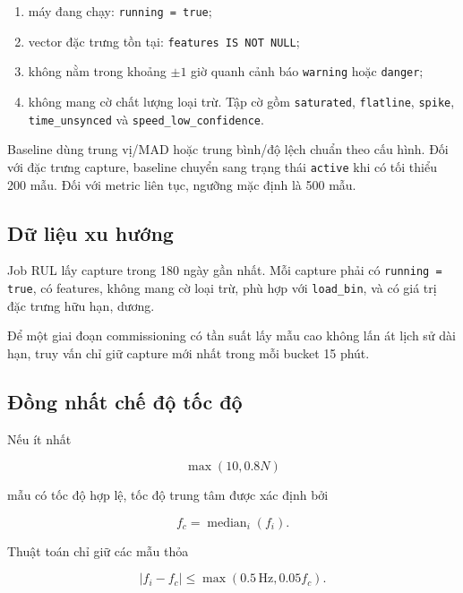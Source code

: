 \documentclass[12pt,a4paper]{article}
\newcommand{\code}[1]{\texttt{#1}}
\begin{document}
\begin{enumerate}
  \item máy đang chạy: \code{running = true};
  \item vector đặc trưng tồn tại: \code{features IS NOT NULL};
  \item không nằm trong khoảng $\pm 1$ giờ quanh cảnh báo \code{warning} hoặc \code{danger};
  \item không mang cờ chất lượng loại trừ. Tập cờ gồm \code{saturated},
  \code{flatline}, \code{spike}, \code{time\_unsynced} và
  \code{speed\_low\_confidence}.
\end{enumerate}

Baseline dùng trung vị/MAD hoặc trung bình/độ lệch chuẩn theo cấu hình. Đối với đặc trưng capture, baseline chuyển sang trạng thái \code{active} khi có tối thiểu 200 mẫu. Đối với metric liên tục, ngưỡng mặc định là 500 mẫu.

\subsection{Dữ liệu xu hướng}

Job RUL lấy capture trong 180 ngày gần nhất. Mỗi capture phải có \code{running = true}, có features, không mang cờ loại trừ, phù hợp với \code{load\_bin}, và có giá trị đặc trưng hữu hạn, dương.

Để một giai đoạn commissioning có tần suất lấy mẫu cao không lấn át lịch sử dài hạn, truy vấn chỉ giữ capture mới nhất trong mỗi bucket 15 phút.

\subsection{Đồng nhất chế độ tốc độ}

Nếu ít nhất

\begin{equation}
  \max(10,0.8N)
\end{equation}

mẫu có tốc độ hợp lệ, tốc độ trung tâm được xác định bởi

\begin{equation}
  f_c=\operatorname{median}_{i}(f_i).
\end{equation}

Thuật toán chỉ giữ các mẫu thỏa

\begin{equation}
  |f_i-f_c|\le \max(0.5\,\mathrm{Hz},0.05f_c).
  \label{eq:speed-filter}
\end{equation}
\end{document}
